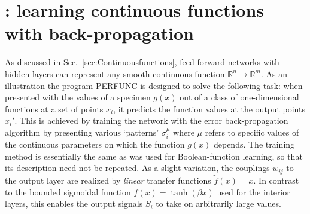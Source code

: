 \section[PERFUNC: learning continuous functions with back-propagation]{: learning continuous functions with back-propagation}
As discussed in Sec.~\ref{sec:Continuousfunctions}, feed-forward networks with hidden layers can represent any smooth continuous function $\mathbb{R}^n\rightarrow\mathbb{R}^m$. As an illustration the program PERFUNC is designed to solve the following task: when presented with the values of a specimen $g(x)$ out of a class of one-dimensional functions at a set of points $x_i$, it predicts the function values at the output points $x_i'$. This is achieved by training the network with the error back-propagation algorithm by presenting various `patterns' $\sigma_i^\mu$ where $\mu$ refers to specific values of the continuous parameters on which the function $g(x)$ depends. The training method is essentially the same as was used for Boolean-function learning, so that its description need not be repeated. As a slight variation, the couplings $w_{ij}$ to the output layer are realized by \emph{linear} transfer functions $\tilde{f}(x)=x$. In contrast to the bounded sigmoidal function $f(x)=\tanh{(\beta x)}$ used for the interior layers, this enables the output signals $S_i$ to take on arbitrarily large values.
